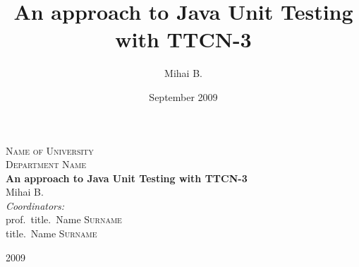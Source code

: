 \title{An approach to Java Unit Testing with TTCN-3}
\author{Mihai B.}
\date{September 2009}

\begin{titlepage}
\begin{center}

\textsc{\Large Name of University}\\
\textsc{\Large Department Name}\\[7cm]

\textbf
{\Huge An approach to Java Unit Testing with TTCN-3}\\[4cm]

{\LARGE Mihai \textsc{B.}}\\[3cm]

\textit{\large Coordinators:}\\
{\Large {\large prof.\ title.\ }Name \textsc{Surname}}\\
{\Large {\large title.\ }Name \textsc{Surname}}\\

\vfill

{\Large 2009}

\end{center}
\end{titlepage}

